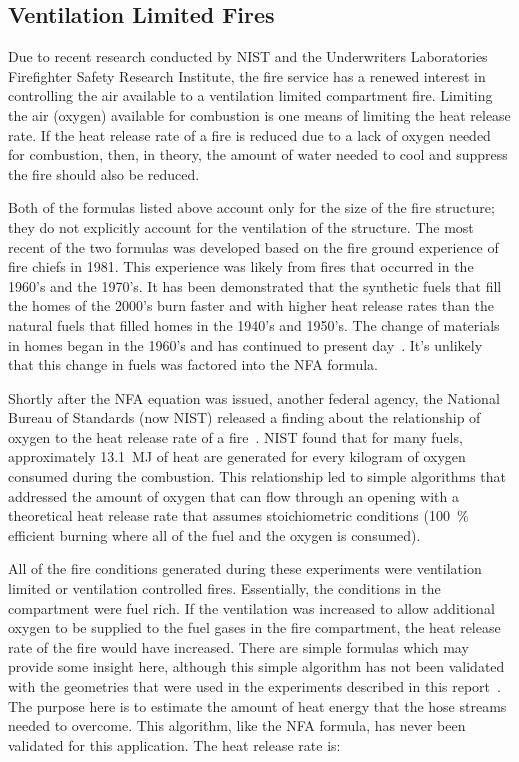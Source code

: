 \documentclass[12pt,oneside]{book}
\begin{document}
\subsection{Ventilation Limited Fires}
Due to recent research conducted by NIST and the Underwriters Laboratories Firefighter Safety Research Institute, the fire service has a renewed interest in controlling the air available to a ventilation limited compartment fire. Limiting the air (oxygen) available for combustion is one means of limiting the heat release rate. If the heat release rate of a fire is reduced due to a lack of oxygen needed for combustion, then, in theory, the amount of water needed to cool and suppress the fire should also be reduced.    

Both of the formulas listed above account only for the size of the fire structure; they do not explicitly account for the ventilation of the structure. The most recent of the two formulas was developed based on the fire ground experience of fire chiefs in 1981. This experience was likely from fires that occurred in the 1960's and the 1970's. It has been demonstrated that the synthetic fuels that fill the homes of the 2000's burn faster and with higher heat release rates than the natural fuels that filled homes in the 1940's and 1950's. The change of materials in homes began in the 1960's and has continued to present day~\cite{Kerber:2}. It's unlikely that this change in fuels was factored into the NFA formula.   

Shortly after the NFA equation was issued, another federal agency, the National Bureau of Standards (now NIST) released a finding about the relationship of oxygen to the heat release rate of a fire~\cite{Babrauskas:3}. NIST found that for many fuels, approximately 13.1~MJ of heat are generated for every kilogram of oxygen consumed during the combustion. This relationship led to simple algorithms that addressed the amount of oxygen that can flow through an opening with a theoretical heat release rate that assumes stoichiometric conditions (100~\% efficient burning where all of the fuel and the oxygen is consumed).

All of the fire conditions generated during these experiments were ventilation limited or ventilation controlled fires. Essentially, the conditions in the compartment were fuel rich. If the ventilation was increased to allow additional oxygen to be supplied to the fuel gases in the fire compartment, the heat release rate of the fire would have increased. There are simple formulas which may provide some insight here, although this simple algorithm has not been validated with the geometries that were used in the experiments described in this report~\cite{Babrauskas:4}. The purpose here is to estimate the amount of heat energy that the hose streams needed to overcome. This algorithm, like the NFA formula, has never been validated for this application. The heat release rate is: 
\end{document}
